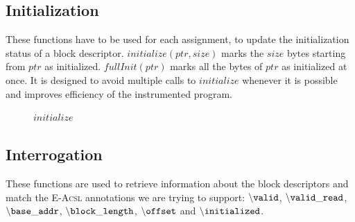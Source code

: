 \documentclass[a4paper,11pt]{article}
\newcommand{\highl}{\colorbox{gray!30}}
\begin{document}


\subsection{Initialization}

These functions have to be used for each assignment, to update the
initialization status of a block descriptor. $initialize(ptr, size)$
marks the $size$ bytes starting from $ptr$ as initialized.
$fullInit(ptr)$ marks all the bytes of $ptr$ as initialized at once.
It is designed to avoid multiple calls to $initialize$ whenever it is
possible and improves efficiency of the instrumented program.


\begin{figure}[h]
  \begin{center}
  \end{center}
  \caption{$initialize$}
\end{figure}




\subsection{Interrogation}

These functions are used to retrieve information about the block descriptors
and match the \textsc{E-Acsl} annotations we are trying to support:
${\tt \backslash valid}$, ${\tt \backslash valid\_read}$,
${\tt \backslash base\_addr}$, ${\tt \backslash block\_length}$,
${\tt \backslash offset}$ and ${\tt \backslash initialized}$.
\end{document}
